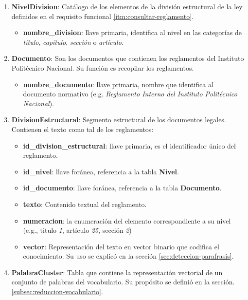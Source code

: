 \begin{enumerate}
    \item \textbf{NivelDivision}: Catálogo de los elementos de la división estructural de la ley definidos en el requisito funcional \ref{itm:consultar-reglamento}.
    
    \begin{itemize}
        \item \textbf{nombre\_division}: llave primaria, identifica al nivel en las categorías de \textit{título}, \textit{capítulo}, \textit{sección} o \textit{artículo}.
    \end{itemize}
    
   \item \textbf{Documento}: Son los documentos que contienen los reglamentos del Instituto Politécnico Nacional. Su función es recopilar los reglamentos.
   
   \begin{itemize}
        \item \textbf{nombre\_documento}: llave primaria, nombre que identifica al documento normativo (e.g. \textit{Reglamento Interno del Instituto Politécnico Nacional}).
    \end{itemize}
   
   \item \textbf{DivisionEstructural}: Segmento estructural de los documentos legales. Contienen el texto como tal de los reglamentos:
   
   \begin{itemize}
        \item \textbf{id\_division\_estructural}: llave primaria, es el identificador único del reglamento.
        \item \textbf{id\_nivel}: llave foránea, referencia a la tabla \textbf{Nivel}.
        \item \textbf{id\_documento}: llave foránea, referencia a la tabla \textbf{Documento}.
        \item \textbf{texto}: Contenido textual del reglamento.
        \item \textbf{numeracion}: la enumeración del elemento correspondiente a su nivel (e.g., titulo \textit{1}, artículo \textit{25}, sección \textit{2})
        \item \textbf{vector}: Representación del texto en vector binario que codifica el conocimiento. Su uso se explicó en la sección \ref{sec:deteccion-parafrasis}. 
    \end{itemize}
   
   \item \textbf{PalabraCluster}: Tabla que contiene la representación vectorial de un conjunto de palabras del vocabulario. Su propósito se definió en la sección. \ref{subsec:reduccion-vocabulario}.
   

\end{enumerate}
